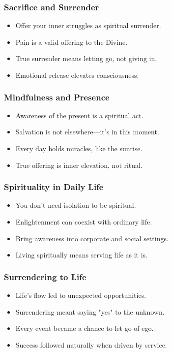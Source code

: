 \begin{frame}[fragile]\frametitle{Sacrifice and Surrender}
  \begin{itemize}
    \item Offer your inner struggles as spiritual surrender.
    \item Pain is a valid offering to the Divine.
    \item True surrender means letting go, not giving in.
    \item Emotional release elevates consciousness.
  \end{itemize}
\end{frame}

\begin{frame}[fragile]\frametitle{Mindfulness and Presence}
  \begin{itemize}
    \item Awareness of the present is a spiritual act.
    \item Salvation is not elsewhere—it's in this moment.
    \item Every day holds miracles, like the sunrise.
    \item True offering is inner elevation, not ritual.
  \end{itemize}
\end{frame}

\begin{frame}[fragile]\frametitle{Spirituality in Daily Life}
  \begin{itemize}
    \item You don’t need isolation to be spiritual.
    \item Enlightenment can coexist with ordinary life.
    \item Bring awareness into corporate and social settings.
    \item Living spiritually means serving life as it is.
  \end{itemize}
\end{frame}

\begin{frame}[fragile]\frametitle{Surrendering to Life}
  \begin{itemize}
    \item Life’s flow led to unexpected opportunities.
    \item Surrendering meant saying "yes" to the unknown.
    \item Every event became a chance to let go of ego.
    \item Success followed naturally when driven by service.
  \end{itemize}
\end{frame}


